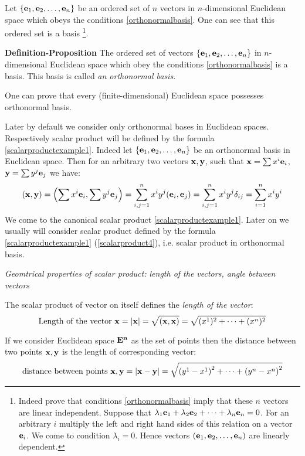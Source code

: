 \documentclass[12pt]{article}
\numberwithin{equation}{section}
\begin{document}
   Let  $\{{\bf e}_1,{\bf e}_2,\dots,{\bf e}_n\}$ be an ordered set of $n$ vectors in $n$-dimensional
   Euclidean space which obeys the conditions
 \eqref{orthonormalbasis}. One can see that this ordered set is a basis
 \footnote
 {Indeed prove that conditions \eqref{orthonormalbasis} imply that these $n$ vectors are linear independent.
 Suppose that $\lambda_1{\bf e}_1+\lambda_2{\bf e}_2+\dots+\lambda_n{\bf e}_n=0$.
 For an arbitrary $i$ multiply the left and right hand sides of this relation on
 a vector ${\bf e}_i$. We come to condition $\lambda_i=0$.
 Hence vectors $({\bf e}_1,{\bf e}_2,\dots,{\bf e}_n)$ are linearly dependent.}.

{\bf Definition-Proposition}   The ordered set of vectors
$\{{\bf e}_1,{\bf e}_2,\dots,{\bf e}_n\}$ in $n$-dimensional Euclidean space which obey the conditions
 \eqref{orthonormalbasis} is a basis.  This basis  is called {\it an orthonormal basis}.



\smallskip

 One can prove that every (finite-dimensional)  Euclidean
 space possesses orthonormal basis.  
 
 Later by default we consider only orthonormal bases in Euclidean spaces.
 Respectively scalar product will be defined by the formula \eqref{scalarproductexample1}.
 Indeed let $\{{\bf e}_1,{\bf e}_2,\dots,{\bf e}_n\}$ be an orthonormal basis in Euclidean space. Then for an arbitrary two vectors
 ${\bf x},{\bf y}$, such that ${\bf x}=\sum x^i{{\bf e}_i}$, ${\bf y}=\sum y^j{{\bf e}_j}$ we have:
    \begin{equation*}\label{scalarproduct4}
    ({\bf x},{\bf y})=\left(\sum x^i{{\bf e}_i},\sum y^j{{\bf e}_j}\right)=
    \sum_{i,j=1}^nx^iy^j({\bf e}_i,{\bf e}_j)=\sum_{i,j=1}^nx^iy^j\delta_{ij}=
    \sum_{i=1}^nx^iy^i
\end{equation*}
 We come to the canonical  scalar product \eqref{scalarproductexample1}.
Later on we usually will consider scalar product defined by the formula
  \eqref{scalarproductexample1} (\eqref{scalarproduct4}), i.e. scalar product in orthonormal basis.


\m


 \centerline {\it Geomtrical properties of scalar product: length of the vectors, angle between vectors}

The scalar product of vector on itself defines the  {\it length of the vector}:
\begin{equation}\label{length}
\hbox {Length of the vector ${\bf x}$}=|{\bf x}|=\sqrt {({\bf x},{\bf x})}=\sqrt {(x^1)^2+\dots+(x^n)^2}
\end{equation}

  If we consider Euclidean space $\bf E^n$  as the set of points then the distance between two points
  ${\bf x},{\bf y}$  is
    the length of corresponding vector:
\begin{equation*}\label{distance}
 \hbox{distance between points ${\bf x},{\bf y}$}= |{\bf x}-{\bf y}|=\sqrt {\left(y^1-x^1\right)^2
 +\dots+\left(y^{n}-x^n\right)^2}
\end{equation*}
\end{document}
